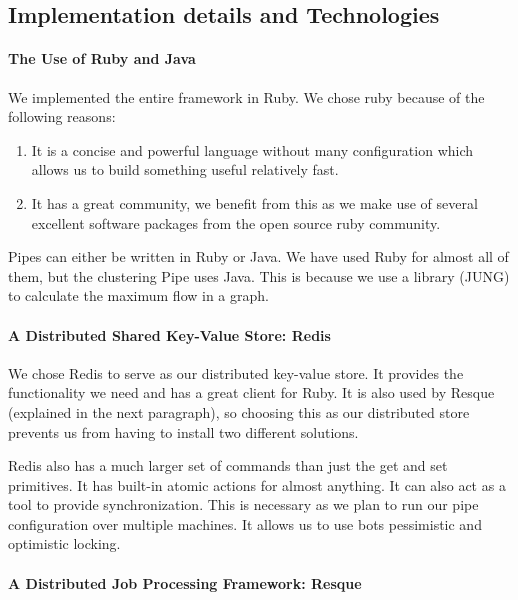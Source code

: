 \subsection{Implementation details and Technologies}

\paragraph{The Use of Ruby and Java}

We implemented the entire framework in Ruby. We chose ruby because of the following reasons:

\begin{enumerate}
\item It is a concise and powerful language without many configuration which allows us to build something useful relatively fast.
\item It has a great community, we benefit from this as we make use of several excellent software packages from the open source ruby community.
\end{enumerate}

Pipes can either be written in Ruby or Java. We have used Ruby for almost all of them, but the clustering Pipe uses Java. This is because we use a library (JUNG) to calculate the maximum flow in a graph.

\paragraph{A Distributed Shared Key-Value Store: Redis}
\label{redis}

We chose Redis to serve as our distributed key-value store. It provides the functionality we need and has a great client for Ruby. It is also used by Resque (explained in the next paragraph), so choosing this as our distributed store prevents us from having to install two different solutions.

Redis also has a much larger set of commands than just the get and set primitives. It has built-in atomic actions for almost anything. It can also act as a tool to provide synchronization. This is necessary as we plan to run our pipe configuration over multiple machines. It allows us to use bots pessimistic and optimistic locking.

\paragraph{A Distributed Job Processing Framework: Resque}
\label{resque}

